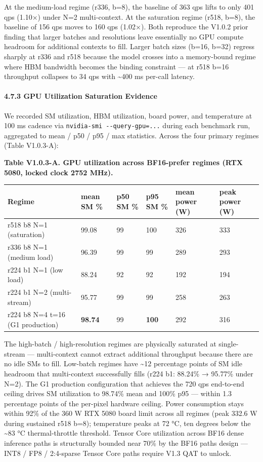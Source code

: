 \documentclass[
]{article}
\newcounter{none} %
\begin{document}
At the medium-load regime (r336, b=8), the baseline of 363 qps lifts to
only 401 qps (1.10×) under N=2 multi-context. At the saturation regime
(r518, b=8), the baseline of 156 qps moves to 160 qps (1.02×). Both
reproduce the V1.0.2 prior finding that larger batches and resolutions
leave essentially no GPU compute headroom for additional contexts to
fill. Larger batch sizes (b=16, b=32) regress sharply at r336 and r518
because the model crosses into a memory-bound regime where HBM bandwidth
becomes the binding constraint --- at r518 b=16 throughput collapses to
34 qps with \textasciitilde400 ms per-call latency.

\paragraph{4.7.3 GPU Utilization Saturation
Evidence}\label{473-gpu-utilization-saturation-evidence}

We recorded SM utilization, HBM utilization, board power, and
temperature at 100 ms cadence via \texttt{nvidia-smi\ -\/-query-gpu=...}
during each benchmark run, aggregated to mean / p50 / p95 / max
statistics. Across the four primary regimes (Table V1.0.3-A):

\textbf{Table V1.0.3-A. GPU utilization across BF16-prefer regimes (RTX
5080, locked clock 2752 MHz).}

{\def\LTcaptype{none} %
\begin{longtable}[]{@{}llllll@{}}
\toprule\noalign{}
Regime & mean SM \% & p50 SM \% & p95 SM \% & mean power (W) & peak
power (W) \\
\midrule\noalign{}
\endhead
\bottomrule\noalign{}
\endlastfoot
r518 b8 N=1 (saturation) & 99.08 & 99 & 100 & 326 & 333 \\
r336 b8 N=1 (medium load) & 96.39 & 99 & 99 & 289 & 293 \\
r224 b1 N=1 (low load) & 88.24 & 92 & 92 & 192 & 194 \\
r224 b1 N=2 (multi-stream) & 95.77 & 99 & 99 & 258 & 263 \\
r224 b8 N=4 t=16 (G1 production) & \textbf{98.74} & 99 & \textbf{100} &
292 & 316 \\
\end{longtable}
}

The high-batch / high-resolution regimes are physically saturated at
single-stream --- multi-context cannot extract additional throughput
because there are no idle SMs to fill. Low-batch regimes have
\textasciitilde12 percentage points of SM idle headroom that
multi-context successfully fills (r224 b1: 88.24\% → 95.77\% under N=2).
The G1 production configuration that achieves the 720 qps end-to-end
ceiling drives SM utilization to 98.74\% mean and 100\% p95 --- within
1.3 percentage points of the per-pixel hardware ceiling. Power
consumption stays within 92\% of the 360 W RTX 5080 board limit across
all regimes (peak 332.6 W during sustained r518 b=8); temperature peaks
at 72 °C, ten degrees below the \textasciitilde83 °C thermal-throttle
threshold. Tensor Core utilization across BF16 dense inference paths is
structurally bounded near 70\% by the BF16 path\textquotesingle s design
--- INT8 / FP8 / 2:4-sparse Tensor Core paths require V1.3 QAT to
unlock.
\end{document}
